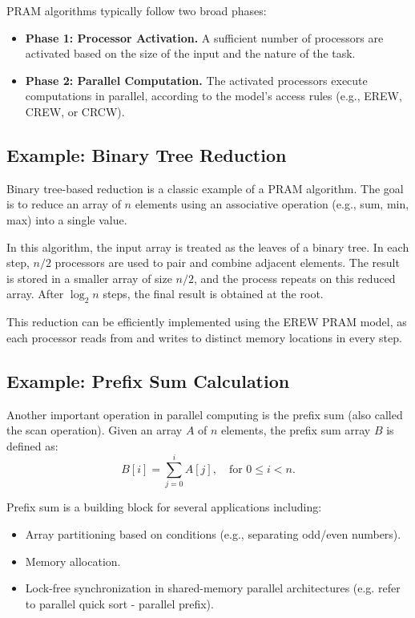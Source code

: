\documentclass[12pt]{book}
\begin{document}
PRAM algorithms typically follow two broad phases:

\begin{itemize}
    \item \textbf{Phase 1: Processor Activation.} A sufficient number of processors are activated based on the size of the input and the nature of the task.
    \item \textbf{Phase 2: Parallel Computation.} The activated processors execute computations in parallel, according to the model's access rules (e.g., EREW, CREW, or CRCW).
\end{itemize}

\subsection{Example: Binary Tree Reduction}

Binary tree-based reduction is a classic example of a PRAM algorithm. The goal is to reduce an array of $n$ elements using an associative operation (e.g., sum, min, max) into a single value.

In this algorithm, the input array is treated as the leaves of a binary tree. In each step, $n/2$ processors are used to pair and combine adjacent elements. The result is stored in a smaller array of size $n/2$, and the process repeats on this reduced array. After $\log_2 n$ steps, the final result is obtained at the root.

This reduction can be efficiently implemented using the EREW PRAM model, as each processor reads from and writes to distinct memory locations in every step.

\subsection{Example: Prefix Sum Calculation}

Another important operation in parallel computing is the prefix sum (also called the scan operation). Given an array $A$ of $n$ elements, the prefix sum array $B$ is defined as:
\[
B[i] = \sum_{j=0}^{i} A[j], \quad \text{for } 0 \leq i < n.
\]

Prefix sum is a building block for several applications including:
\begin{itemize}
    \item Array partitioning based on conditions (e.g., separating odd/even numbers).
    \item Memory allocation.
    \item Lock-free synchronization in shared-memory parallel architectures (e.g. refer to parallel quick sort - parallel prefix).
\end{itemize}
\end{document}
